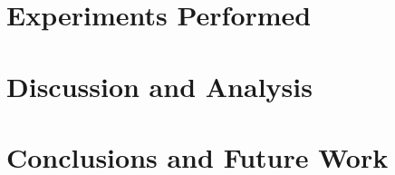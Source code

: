 \documentclass[journal]{IEEEtran}
\begin{document}
\section{Experiments Performed}
\label{sec:experiments}

\section{Discussion and Analysis}
\section{Conclusions and Future Work}



%
%



%
%
\end{document}
